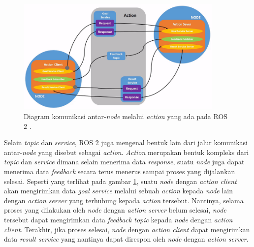 \begin{figure}
  \centering
  \includegraphics[width=0.9\textwidth,keepaspectratio]{gambar/diagram-action-ros2.png}
  \caption{Diagram komunikasi antar-\emph{node} melalui \emph{action} yang ada pada ROS 2 \citep{url:understandingros2actions}.}
  \label{fig:diagramactionros2}
\end{figure}

Selain \emph{topic} dan \emph{service},
  ROS 2 juga mengenal bentuk lain dari jalur komunikasi antar-\emph{node} yang disebut sebagai \emph{action}.
\emph{Action} merupakan bentuk kompleks dari \emph{topic} dan \emph{service} dimana selain menerima data \emph{response},
  suatu \emph{node} juga dapat menerima data \emph{feedback} secara terus menerus sampai proses yang dijalankan selesai.
Seperti yang terlihat pada gambar \ref{fig:diagramactionros2},
  suatu \emph{node} dengan \emph{action client} akan mengirimkan data \emph{goal service} melalui sebuah \emph{action} kepada \emph{node} lain dengan \emph{action server} yang terhubung kepada \emph{action} tersebut.
Nantinya, selama proses yang dilakukan oleh \emph{node} dengan \emph{action server} belum selesai,
  \emph{node} tersebut dapat mengirimkan data \emph{feedback topic} kepada \emph{node} dengan \emph{action client}.
Terakhir, jika proses selesai, \emph{node} dengan \emph{action client} dapat mengirimkan data \emph{result service} yang nantinya dapat direspon oleh \emph{node} dengan \emph{action server}.
